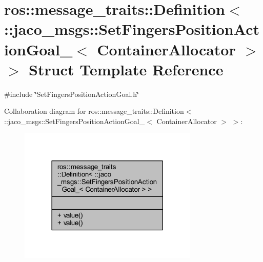 \hypertarget{structros_1_1message__traits_1_1Definition_3_01_1_1jaco__msgs_1_1SetFingersPositionActionGoal___5076b256990d9b08a420815c0a2c9b99}{}\section{ros\+:\+:message\+\_\+traits\+:\+:Definition$<$ \+:\+:jaco\+\_\+msgs\+:\+:Set\+Fingers\+Position\+Action\+Goal\+\_\+$<$ Container\+Allocator $>$ $>$ Struct Template Reference}
\label{structros_1_1message__traits_1_1Definition_3_01_1_1jaco__msgs_1_1SetFingersPositionActionGoal___5076b256990d9b08a420815c0a2c9b99}


{\ttfamily \#include \char`\"{}Set\+Fingers\+Position\+Action\+Goal.\+h\char`\"{}}



Collaboration diagram for ros\+:\+:message\+\_\+traits\+:\+:Definition$<$ \+:\+:jaco\+\_\+msgs\+:\+:Set\+Fingers\+Position\+Action\+Goal\+\_\+$<$ Container\+Allocator $>$ $>$\+:
\nopagebreak
\begin{figure}[H]
\begin{center}
\leavevmode
\includegraphics[width=242pt]{d5/d0b/structros_1_1message__traits_1_1Definition_3_01_1_1jaco__msgs_1_1SetFingersPositionActionGoal___ef1fdd4475179f80fff9057c4ba7299a}
\end{center}
\end{figure}
